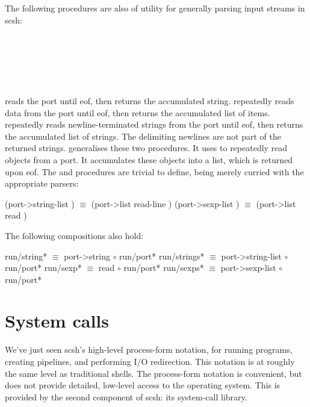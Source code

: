 The following procedures are also of utility for generally parsing 
input streams in scsh:
\begin{center}
\begin{column}
 \\
 \\
 \\
\end{column}
\end{center}
 reads the port until eof,
then returns the accumulated string.
 repeatedly reads data from the port until eof, 
then returns the accumulated list of items.  
 repeatedly reads newline-terminated strings from the
port until eof, then returns the accumulated list of strings.
The delimiting newlines are not part of the returned strings.
 generalises these two procedures.
It uses  to repeatedly read objects from a port.
It accumulates these objects into a list, which is returned upon eof.
The  and  procedures
are trivial to define, being merely  curried with
the appropriate parsers:
\begin{code}\cddollar
(port->string-list ) $\equiv$ (port->list read-line )
(port->sexp-list   ) $\equiv$ (port->list read )\end{code}
%
The following compositions also hold:
\begin{code}\cddollar
run/string*   $\equiv$  port->string      $\circ$ run/port*
run/strings*  $\equiv$  port->string-list $\circ$ run/port*
run/sexp*     $\equiv$  read              $\circ$ run/port*
run/sexps*    $\equiv$  port->sexp-list   $\circ$ run/port*\end{code}


\section{System calls}
\label{sec:syscall-lib}
We've just seen scsh's high-level process-form notation,
for running programs, creating pipelines, and performing I/O redirection.
This notation is at roughly the same level as traditional {\Unix} shells.
The process-form notation is convenient, but does not provide detailed,
low-level access to the operating system.
This is provided by the second component of scsh: its system-call library.

